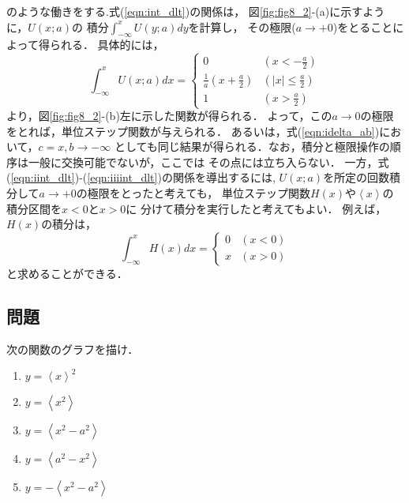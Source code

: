 \documentclass[10pt,a4j]{jbook}
\begin{document}
のような働きをする.式(\ref{eqn:int_dlt})の関係は，
図\ref{fig:fig8_2}-(a)に示すように，$U(x;a)$の
積分$\int_{-\infty}^x U(y;a)dy$を計算し，
その極限($a\rightarrow +0$)をとることによって得られる．
具体的には，
\begin{equation}
	\int_{-\infty}^x U(x;a)dx=\left\{
	\begin{array}{cc}
		0 & \left(x<-\frac{a}{2} \right) \\
		\frac{1}{a}\left(x+\frac{a}{2}\right) & \left( |x| \leq \frac{a}{2} \right) \\
		1 & \left(x>\frac{a}{2} \right) 
	\end{array}
	\right.
\end{equation}
より，図\ref{fig:fig8_2}-(b)左に示した関数が得られる．
よって，この$a\rightarrow 0$の極限をとれば，単位ステップ関数が与えられる．
あるいは，式(\ref{eqn:idelta_ab})において，$c=x,b\rightarrow -\infty$
としても同じ結果が得られる．なお，積分と極限操作の順序は一般に交換可能でないが，ここでは
その点には立ち入らない．
一方，式(\ref{eqn:iint_dlt})-(\ref{eqn:iiiint_dlt})の関係を導出するには,
$U(x;a)$を所定の回数積分して$a\rightarrow +0$の極限をとったと考えても，
単位ステップ関数$H(x)$や$\left< x \right>$の積分区間を$x<0$と$x>0$に
分けて積分を実行したと考えてもよい．
例えば，$H(x)$の積分は，
\begin{equation}
	\int_{-\infty}^x H(x)dx
	=\left\{
	\begin{array}{cc}
		0 & (x<0) \\
		x & (x>0)
	\end{array}
	\right.
\end{equation}
と求めることができる．
\subsection{問題}
次の関数のグラフを描け．
\begin{enumerate}
\item $y=\left< x \right>^2$
\item $y=\left< x^2 \right>$
\item $y=\left< x^2-a^2 \right>$
\item $y=\left< a^2-x^2 \right>$
\item $y=-\left< x^2-a^2 \right>$
\end{enumerate}
\end{document}
